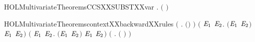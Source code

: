 \newcommand{\HOLMultivariateTheoremsCCSXXSUBSTXXsum}{\UseVerbatim{HOLMultivariateTheoremsCCSXXSUBSTXXsum}}
\begin{SaveVerbatim}{HOLMultivariateTheoremsCCSXXSUBSTXXvar}
\HOLTokenTurnstile{} \HOLSymConst{\HOLTokenForall{}} .
         \ensuremath{(} \ensuremath{)} \HOLSymConst{\ensuremath{=}}
         \HOLConst{\HOLTokenIn{}}         
\end{SaveVerbatim}
\newcommand{\HOLMultivariateTheoremsCCSXXSUBSTXXvar}{\UseVerbatim{HOLMultivariateTheoremsCCSXXSUBSTXXvar}}
\begin{SaveVerbatim}{HOLMultivariateTheoremscontextXXbackwardXXrules}
\HOLTokenTurnstile{} \ensuremath{(}\HOLSymConst{\HOLTokenForall{}}  .   \ensuremath{(}\HOLSymConst{\ensuremath{\ldotp}}\ensuremath{)} \HOLSymConst{\HOLTokenImp{}}   \ensuremath{)} \HOLSymConst{\HOLTokenConj{}}
   \ensuremath{(}\HOLSymConst{\HOLTokenForall{}} \ensuremath{\HOLBoundVar{E}\sb{\mathrm{1}}} \ensuremath{\HOLBoundVar{E}\sb{\mathrm{2}}}.
          \ensuremath{(}\ensuremath{\HOLBoundVar{E}\sb{\mathrm{1}}} \HOLSymConst{\ensuremath{+}} \ensuremath{\HOLBoundVar{E}\sb{\mathrm{2}}}\ensuremath{)} \HOLSymConst{\HOLTokenImp{}}   \ensuremath{\HOLBoundVar{E}\sb{\mathrm{1}}} \HOLSymConst{\HOLTokenConj{}}   \ensuremath{\HOLBoundVar{E}\sb{\mathrm{2}}}\ensuremath{)} \HOLSymConst{\HOLTokenConj{}}
   \ensuremath{(}\HOLSymConst{\HOLTokenForall{}} \ensuremath{\HOLBoundVar{E}\sb{\mathrm{1}}} \ensuremath{\HOLBoundVar{E}\sb{\mathrm{2}}}.
          \ensuremath{(}\ensuremath{\HOLBoundVar{E}\sb{\mathrm{1}}} \HOLSymConst{\ensuremath{\mid}} \ensuremath{\HOLBoundVar{E}\sb{\mathrm{2}}}\ensuremath{)} \HOLSymConst{\HOLTokenImp{}}   \ensuremath{\HOLBoundVar{E}\sb{\mathrm{1}}} \HOLSymConst{\HOLTokenConj{}}   \ensuremath{\HOLBoundVar{E}\sb{\mathrm{2}}}\ensuremath{)} \HOLSymConst{\HOLTokenConj{}}
   \ensuremath{(}\HOLSymConst{\HOLTokenForall{}}  .   \ensuremath{(}  \ensuremath{)} \HOLSymConst{\HOLTokenImp{}}   \ensuremath{)} \HOLSymConst{\HOLTokenConj{}}

\end{SaveVerbatim}
